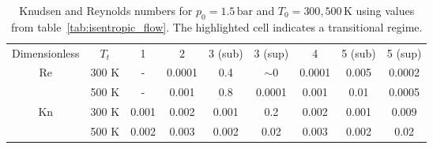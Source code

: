 \begin{table}[H]
    \centering
    \begin{tabular}{|c|c|c|c|c|c|c|c|c|}
    \hline
    \multirow{2}{*}{Dimensionless} & \multirow{2}{*}{$T_t$}
    & \multirow{2}{*}{1} & \multirow{2}{*}{2} & \multirow{2}{*}{3 (sub)}
    & \multirow{2}{*}{3 (sup)} & \multirow{2}{*}{4}
    & \multirow{2}{*}{5 (sub)} & \multirow{2}{*}{5 (sup)} \\
    & & & & & & & & \\ \hline

    \multirow{2}{*}{Re}
      & 300 K & - & 0.0001 & 0.4 & $\sim 0$ & 0.0001 & 0.005 & 0.0002 \\
      & 500 K & - & 0.001  & 0.8 & 0.0001   & 0.001  & 0.01  & 0.0005 \\ \hline

    \multirow{2}{*}{Kn}
      & 300 K & 0.001 & 0.002 & 0.001 & \cellcolor[HTML]{FFADA8}0.2
              & 0.002 & 0.001 & 0.009 \\
      & 500 K & 0.002 & 0.003 & 0.002 & 0.02
              & 0.003 & 0.002 & 0.02 \\ \hline
    \end{tabular}
    \caption{Knudsen and Reynolds numbers for $p_0 = 1.5\,\mathrm{bar}$ 
        and $T_0 = 300, 500\,\mathrm{K}$ using values from 
        table~\ref{tab:isentropic_flow}. The highlighted cell indicates 
        a transitional regime.}
    \label{tab:test-knudsen-reynolds-isentropic}
\end{table}
